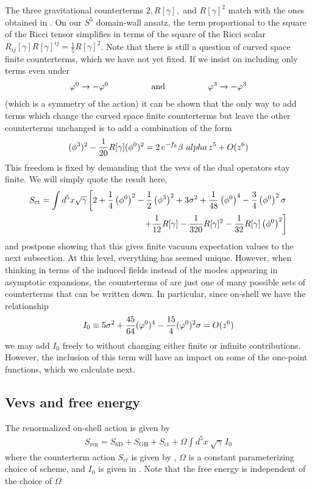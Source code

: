 \documentclass[12pt]{article}
\begin{document}
The three gravitational counterterms $2, R[\gamma],$ and $R[\gamma]^2$ match with the ones obtained in . On our $S^5$ domain-wall ansatz, the term proportional to the square of the Ricci tensor simplifies in terms of the square of the Ricci scalar $R_{ij}[\gamma]R[\gamma]^{ij}=\frac15 R[\gamma]^2$. 
Note that there is still a question of curved space finite counterterms, which we have not yet fixed. If we insist on including only terms even under 
\begin{eqnarray}
\varphi^0 \rightarrow -\varphi^0 \hspace{0.7in}\mathrm{and} \hspace{0.7in} \varphi^3 \rightarrow -\varphi^3
\end{eqnarray} 
(which is a symmetry of the action) it can be shown that the only way to add terms which change the curved space finite counterterms but leave the other counterterms unchanged is to add a combination of the form 
\begin{eqnarray}
(\phi^3)^2 - {1 \over 20} R[\gamma] (\phi^0)^2 = 2\, e^{-f_k} \beta\ alpha \,z^5 + O(z^6)
\end{eqnarray}
This freedom is fixed by demanding that the vevs of the dual operators stay finite. We will simply quote the result here, \begin{eqnarray}
S_{\mathrm{ct}} = \int d^5 x \sqrt{\gamma} \left[2 + {1 \over 4} \left(\phi^0\right)^2 - {1 \over 2} \left(\phi^3\right)^2 + 3 \sigma^2 +{1 \over 48 }\left(\phi^0\right)^4 - {3 \over 4} \left(\phi^0\right)^2 \sigma\right.
\nonumber\\
\vphantom{.}\hspace{1.4 in}\left. + {1 \over 12} R[\gamma] - {1 \over 320} R[\gamma]^2 - {1 \over 32} R[\gamma] \left(\phi^0\right)^2 \right]
\end{eqnarray}
and postpone showing that this gives finite vacuum expectation values to the next subsection.
At this level, everything has seemed unique. However, when thinking in terms of the induced fields instead of the modes appearing in asymptotic expansions, the counterterms of  are just one of many possible sets of counterterms that can be written down. In particular, since on-shell we have the relationship 
\begin{eqnarray}
I_0 \equiv 5 \sigma^2 + {45 \over 64} (\varphi^0)^4 - {15 \over 4} (\varphi^0)^2 \sigma =  O(z^6)
\end{eqnarray}
we may add $I_0$ freely to  without changing either finite or infinite contributions. However, the inclusion of this term will have an impact on some of the one-point functions, which we calculate next.
\subsection{Vevs and free energy}
The renormalized on-shell action is given by 
\begin{eqnarray}
S_{\mathrm{ren}} = S_{\mathrm{6D}} + S_{\mathrm{GH}} + S_{\mathrm{ct}} + \Omega \int d^5 x~  \sqrt{\gamma}\, I_0
\end{eqnarray}
where the counterterm action $S_{ct}$ is given by , $\Omega$ is a constant parameterizing choice of scheme, and $I_0$ is given in . Note that the free energy is independent of the choice of $\Omega$ 
\end{document}
